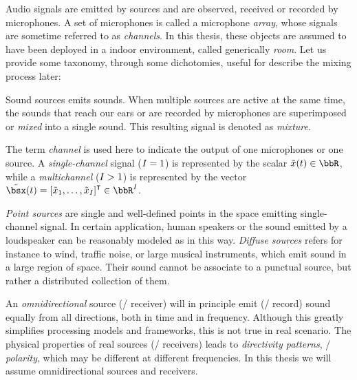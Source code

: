 \mynewline
Audio signals are emitted by sources and are observed, received or recorded by microphones.
A set of microphones is called a microphone \textit{array}, whose signals are sometime referred to as \textit{channels}.
In this thesis, these objects are assumed to have been deployed in a indoor environment, called generically \textit{room}.
Let us provide some taxonomy, through some dichotomies, useful for describe the mixing process later:

 Sound sources emits sounds.
When multiple sources are active at the same time, the sounds that reach our ears or are recorded by microphones are superimposed or \textit{mixed} into a single sound.
This resulting signal is denoted as \textit{mixture}.

 The term \textit{channel}
is used here to indicate the output of one microphones or one source.
A \textit{single-channel} signal ($I = 1$) is represented by the scalar $\tilde{\mic}(t) \in \R$,
while a \textit{multichannel} ($I >   1$) is represented by the vector $\tilde{\mics}(t) = \ktranspose{\klist{\tilde{\mic}_1, \dots, \tilde{\mic}_{\numMics}}} \in \R^{\numMics}$.

 \textit{Point sources} are single and well-defined points in the space emitting single-channel signal.
In certain application, human speakers or the sound emitted by a loudspeaker can be reasonably modeled as in this way.
\textit{Diffuse sources} refers for instance to wind, traffic noise, or large musical instruments, which emit sound in a large region of space.
Their sound cannot be associate to a punctual source, but rather a distributed collection of them.

 An \textit{omnidirectional} source (\resp/ receiver) will in principle emit (\resp/ record) sound equally from all directions,
both in time and in frequency.
Although this greatly simplifies processing models and frameworks, this is not true in real scenario.
The physical properties of real sources (\resp/ receivers) leads to \textit{directivity patterns}, \aka/ \textit{polarity}, which may
be different at different frequencies.
In this thesis we will assume omnidirectional sources and receivers.

